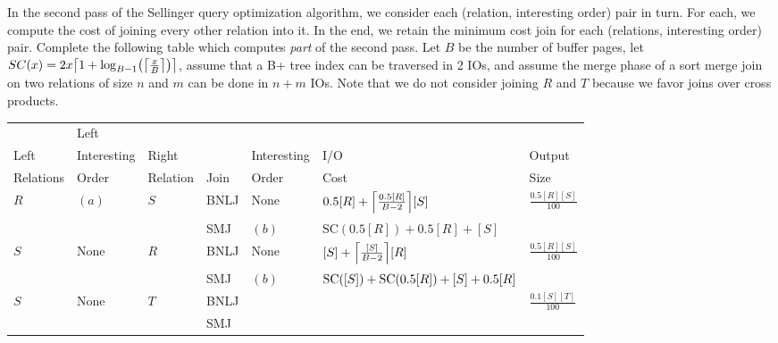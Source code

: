 \documentclass{article}
\newcommand{\sol}[1]{\iftoggle{showsolutions}{\textcolor{red}{#1}}{\phantom{#1}}}
\begin{document}
In the second pass of the Sellinger query optimization algorithm, we consider
each (relation, interesting order) pair in turn. For each, we compute the cost
of joining every other relation into it. In the end, we retain the minimum cost
join for each (relations, interesting order) pair. Complete the following table
which computes \emph{part} of the second pass. Let $B$ be the number of buffer
pages, let $SC(x) = \sortcost{x}$, assume that a B+ tree index can be traversed
in 2 IOs, and assume the merge phase of a sort merge join on two relations of
size $n$ and $m$ can be done in $n + m$ IOs. Note that we do not consider
joining $R$ and $T$ because we favor joins over cross products.
\begin{center}
  \begin{tabular}{|l|l|l|l|l|l|l|}
    \hline
                          & Left                   &                      &      &                &                                       & \\
    Left                  & Interesting            & Right                &      & Interesting    & I/O                                   & Output                                   \\
    Relations             & Order                  & Relation             & Join & Order          & Cost                                  & Size                                     \\\hline
    \multirow{2}{*}{$R$}  & \multirow{2}{*}{$(a)$} & \multirow{2}{*}{$S$} & BNLJ & None           & $\bnlj{0.5[R]}{[S]}$                  & \multirow{2}{*}{$\frac{0.5[R][S]}{100}$} \\\cline{4-6}
                          &                        &                      & SMJ  & $(b)$          & $\text{SC}(0.5[R]) + 0.5[R] + [S]$    & \\\hline
    \multirow{2}{*}{$S$}  & \multirow{2}{*}{None}  & \multirow{2}{*}{$R$} & BNLJ & None           & $\bnlj{[S]}{[R]}$                     & \multirow{2}{*}{$\frac{0.5[R][S]}{100}$} \\\cline{4-6}
                          &                        &                      & SMJ  & $(b)$          & $\text{SC}([S]) + \text{SC}(0.5[R]) + [S] + 0.5[R]$                   & \\\hline
    \multirow{2}{*}{$S$}  & \multirow{2}{*}{None}  & \multirow{2}{*}{$T$} & BNLJ & \sol{None}     & \sol{$\bnlj{[S]}{[T]}$}               & \multirow{2}{*}{$\frac{0.1[S][T]}{100}$} \\\cline{4-6}
                          &                        &                      & SMJ  & \sol{$(c)$}    & \sol{$\text{SC}([S]) + [S] + 0.1[T]$} & \\\hline

\end{tabular}
\end{center}
\end{document}
